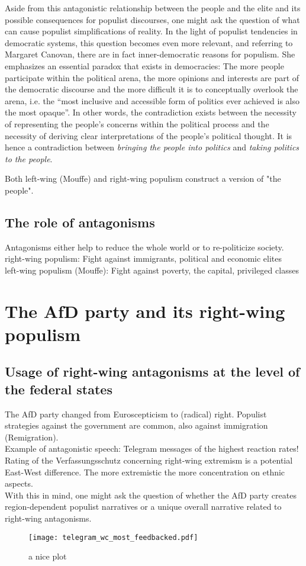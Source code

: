 \documentclass[a4paper]{scrreprt}
\begin{document}
Aside from this antagonistic relationship between the people and the elite and its possible consequences for populist discourses, one might ask the question of what can cause populist simplifications of reality. In the light of populist tendencies in democratic systems, this question becomes even more relevant, and referring to Margaret Canovan, there are in fact inner-democratic reasons for populism. She emphasizes an essential paradox that exists in democracies: The more people participate within the political arena, the more opinions and interests are part of the democratic discourse and the more difficult it is to conceptually overlook the arena, i.e. the ``most inclusive and accessible form of politics ever achieved is also the most opaque''. \cite[p.~25]{canovan:2002} In other words, the contradiction exists between the necessity of representing the people's concerns within the political process and the necessity of deriving clear interpretations of the people's political thought. It is hence a contradiction between {\em bringing the people into politics} and {\em taking politics to the people}. \cite[p.~26]{canovan:2002}\par
Both left-wing (Mouffe) and right-wing populism construct a version of "the people".
\section{The role of antagonisms}
Antagonisms either help to reduce the whole world or to re-politicize society.\\
right-wing populism: Fight against immigrants, political and economic elites\\
left-wing populism (Mouffe): Fight against poverty, the capital, privileged classes
\chapter{The AfD party and its right-wing populism}
\section{Usage of right-wing antagonisms at the level of the federal states}
The AfD party changed from Euroscepticism to (radical) right. Populist strategies against the government are common, also against immigration (Remigration).\\
Example of antagonistic speech: Telegram messages of the highest reaction rates!\\
Rating of the Verfassungsschutz concerning right-wing extremism is a potential East-West difference. The more extremistic the more concentration on ethnic aspects.\\
With this in mind, one might ask the question of whether the AfD party creates region-dependent populist narratives or a unique overall narrative related to right-wing antagonisms.
\begin{figure}
    \centering
    \texttt{[image: telegram\_wc\_most\_feedbacked.pdf]}
    \caption{a nice plot}
\end{figure}
\end{document}
